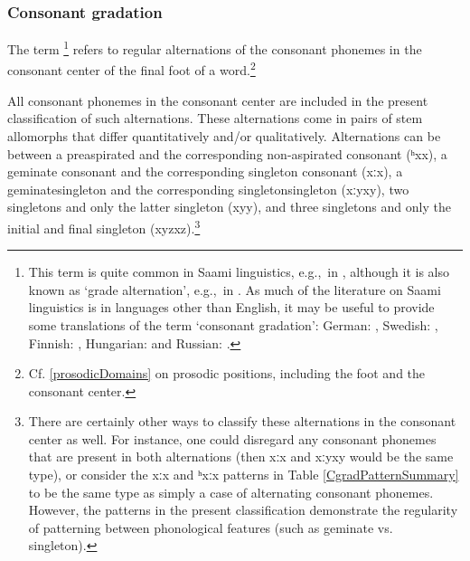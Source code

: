 \subsubsection{Consonant gradation}\label{Cgrad}
The term \footnote{This term is quite common in Saami linguistics, e.g.,~in \citet{Feist2010}, although it is also known as ‘grade alternation’, e.g.,~in \citet{Sammallahti1998}. As much of the literature on Saami linguistics is in languages other than English, it may be useful to provide some translations of the term ‘consonant gradation’: German: , Swedish: , Finnish: , Hungarian:  and Russian: .} 
refers to regular alternations of the consonant phonemes in the consonant center of the final foot of a word.\footnote{Cf. \SEC\ref{prosodicDomains} on prosodic positions, including the foot and the consonant center.} 

All consonant phonemes in the consonant center are included in the present classification of such alternations.
These alternations come in pairs of stem allomorphs that differ quantitatively and/or qualitatively. 
Alternations can be between a preaspirated and the corresponding non-aspirated consonant \mbox{(ʰx\Div x)},  
 a geminate consonant and the corresponding singleton consonant \mbox{(xː\Div x)}, 
 a geminate\PLUS singleton and the corresponding singleton\PLUS singleton \mbox{(xːy\Div xy)}, 
 two singletons and only the latter singleton \mbox{(xy\Div y)}, 
and  three singletons and only the initial and final singleton \mbox{(xyz\Div xz)}.\footnote{There are certainly other ways to classify these alternations in the consonant center as well. For instance, one could disregard any consonant phonemes that are present in both alternations (then \mbox{xː\Div x} and \mbox{xːy\Div xy} would be the same type), or consider the xː\Div x and ʰxː\Div x patterns in Table \ref{CgradPatternSummary} to be the same type as simply a case of alternating consonant phonemes. However, the patterns in the present classification demonstrate the regularity of patterning between phonological features (such as geminate vs. singleton).}  

